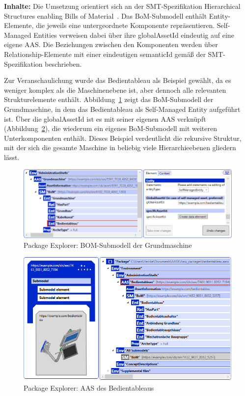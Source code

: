 \textbf{Inhalte:}  
Die Umsetzung orientiert sich an der SMT-Spezifikation Hierarchical Structures enabling Bills of Material~\cite{SpezifikationHierachischeStrukturen}.  
Das BoM-Submodell enthält Entity-Elemente, die jeweils eine untergeordnete Komponente repräsentieren.  
Self-Managed Entities verweisen dabei über ihre globalAssetId eindeutig auf eine eigene AAS.  
Die Beziehungen zwischen den Komponenten werden über Relationship-Elemente mit einer eindeutigen semanticId gemäß der SMT-Spezifikation beschrieben.  

Zur Veranschaulichung wurde das Bedientableau als Beispiel gewählt, da es weniger komplex als die Maschinenebene ist, aber dennoch alle relevanten Strukturelemente enthält.  
Abbildung~\ref{fig:BOMSubmodelGrundmashcine} zeigt das BoM-Submodell der Grundmaschine, in dem das Bedientableau als Self-Managed Entity aufgeführt ist.  
Über die globalAssetId ist es mit seiner eigenen AAS verknüpft (Abbildung~\ref{fig:AASBedientableau}), die wiederum ein eigenes BoM-Submodell mit weiteren Unterkomponenten enthält.  
Dieses Beispiel verdeutlicht die rekursive Struktur, mit der sich die gesamte Maschine in beliebig viele Hierarchieebenen gliedern lässt.

\begin{figure}[htbp]
    \centering
        \includegraphics[width=1\textwidth]{Bilder/ErgebnissePackageExplorer/GundmaschneEntitie.PNG}
    \caption{Package Explorer: BOM-Submodell der Grundmaschine}
    \label{fig:BOMSubmodelGrundmashcine}
\end{figure}

\begin{figure}[htbp]
    \centering
        \includegraphics[width=1\textwidth]{Bilder/ErgebnissePackageExplorer/Bedientableau+.PNG}
    \caption{Package Explorer: AAS des Bedientableaus}
    \label{fig:AASBedientableau}
\end{figure}

